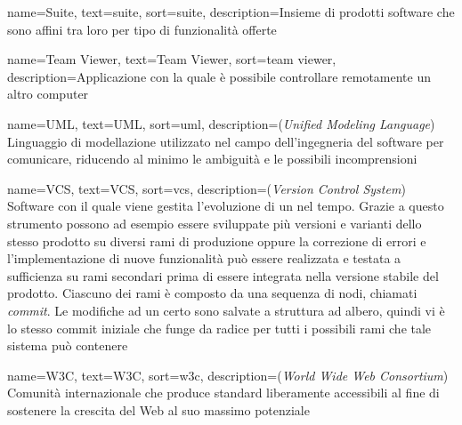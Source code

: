 {
    name={Suite},
    text=suite,
    sort=suite,
    description={Insieme di prodotti software che sono affini tra loro per tipo di funzionalità offerte}
}

{
    name={Team Viewer},
    text=Team Viewer,
    sort=team viewer,
    description={Applicazione con la quale è possibile controllare remotamente un altro computer}
}

{
    name={UML},
    text=UML,
    sort=uml,
    description={(\emph{Unified Modeling Language}) Linguaggio di modellazione utilizzato nel campo dell'ingegneria del software per comunicare, riducendo al minimo le ambiguità e le possibili incomprensioni}
}

{
    name={VCS},
    text=VCS,
    sort=vcs,
    description={(\emph{Version Control System}) Software con il quale viene gestita l'evoluzione di un  nel tempo. Grazie a questo strumento possono ad esempio essere sviluppate più versioni e varianti dello stesso prodotto su diversi rami di produzione oppure la correzione di errori e l'implementazione di nuove funzionalità può essere realizzata e testata a sufficienza su rami secondari prima di essere integrata nella versione stabile del prodotto.
    Ciascuno dei rami è composto da una sequenza di nodi, chiamati \emph{commit}. Le modifiche ad un certo  sono salvate a struttura ad albero, quindi vi è lo stesso commit iniziale che funge da radice per tutti i possibili rami che tale sistema può contenere}
}

{
    name={W3C},
    text=W3C,
    sort=w3c,
    description={(\emph{World Wide Web Consortium}) Comunità internazionale che produce standard liberamente accessibili al fine di sostenere la crescita del Web al suo massimo potenziale}
}
